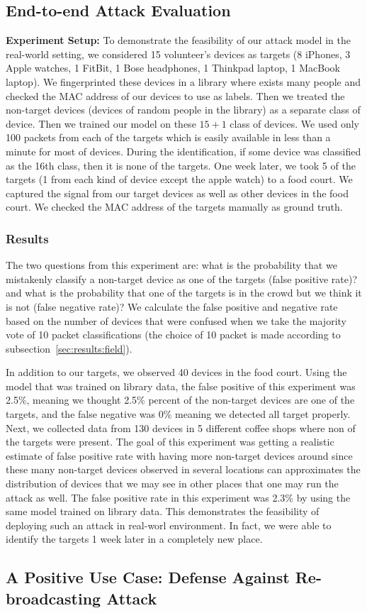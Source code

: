 \subsection{End-to-end Attack Evaluation}
\label{sec:results:attack}
\noindent\textbf{Experiment Setup:}
To demonstrate the feasibility of our attack model in the real-world setting, we
considered 15 volunteer's devices as targets (8 iPhones, 3 Apple watches, 1
FitBit, 1 Bose headphones, 1 Thinkpad laptop, 1 MacBook laptop). We fingerprinted
these devices in a library where exists many people and checked the MAC address
of our devices to use as labels. Then we treated the non-target devices
(devices of random people in the library) as a separate class of device. Then
we trained our model on these $15+1$ class of devices. We used only 100 packets
from each of the targets which is easily available in less than a minute for
most of devices. During the identification, if some device was classified as
the 16th class, then it is none of the targets.
%
One week later, we took 5 of the
targets (1 from each kind of device except the apple watch) to a food court. We
captured the signal from our target devices as well as other devices in the
food court. We checked the MAC address of the targets manually as ground truth.

\subsubsection*{Results}

The two questions from this experiment are: what is the probability that we
mistakenly classify a non-target device as one of the targets (false positive
rate)? and what is the probability that one of the targets is in the crowd but
we think it is not (false negative rate)? We calculate the false positive 
and negative rate based on the number of devices that were confused when
we take the majority vote of 10 packet classifications (the choice of 10 packet is made according to subsection~\ref{sec:results:field}). 

In addition to our targets, we observed 40 devices in the food court. Using the model that was trained on library data, the false positive of this experiment was 2.5\%, meaning we thought 2.5\%
percent of the non-target devices are one of the targets, and the false
negative was 0\% meaning we detected all target properly.
%
Next, we collected data from 130 devices in 5 different coffee shops where non
of the targets were present. The goal of this experiment was getting a
realistic estimate of false positive rate with having more non-target devices around since these many non-target devices observed in several locations can approximates the distribution of devices that we may see in other places that one may run the attack as well. The false positive rate in this
experiment was 2.3\% by using the same model trained on library data. This demonstrates the feasibility of deploying such an attack in real-worl environment. In fact, we were able to identify the targets 1 week later in a completely new place.


\subsection{A Positive Use Case: Defense Against Re-broadcasting Attack}